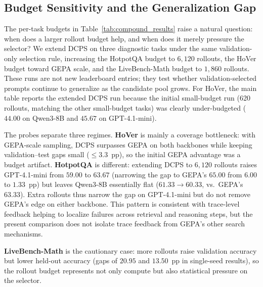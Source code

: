 \documentclass[runningheads]{llncs}
\begin{document}
\subsection{Budget Sensitivity and the Generalization Gap}
\label{sec:budget-matched}
The per-task budgets in Table~\ref{tab:compound_results} raise a natural question: when does a larger rollout budget help, and when does it merely pressure the selector? We extend DCPS on three diagnostic tasks under the same validation-only selection rule, increasing the HotpotQA budget to $6{,}120$ rollouts, the HoVer budget toward GEPA scale, and the LiveBench-Math budget to $1{,}860$ rollouts. These runs are not new leaderboard entries; they test whether validation-selected prompts continue to generalize as the candidate pool grows. For HoVer, the main table reports the extended DCPS run because the initial small-budget run (620 rollouts, matching the other small-budget tasks) was clearly under-budgeted ($44.00$ on Qwen3-8B and $45.67$ on GPT-4.1-mini).

The probes separate three regimes. \textbf{HoVer} is mainly a coverage bottleneck: with GEPA-scale sampling, DCPS surpasses GEPA on both backbones while keeping validation--test gaps small ($\le3.3$~pp), so the initial GEPA advantage was a budget artifact. \textbf{HotpotQA} is different: extending DCPS to $6{,}120$ rollouts raises GPT-4.1-mini from $59.00$ to $63.67$ (narrowing the gap to GEPA's $65.00$ from $6.00$ to $1.33$~pp) but leaves Qwen3-8B essentially flat ($61.33\!\to\!60.33$, vs.\ GEPA's $63.33$). Extra rollouts thus narrow the gap on GPT-4.1-mini but do not remove GEPA's edge on either backbone. This pattern is consistent with trace-level feedback helping to localize failures across retrieval and reasoning steps, but the present comparison does not isolate trace feedback from GEPA's other search mechanisms.

\textbf{LiveBench-Math} is the cautionary case: more rollouts raise validation accuracy but lower held-out accuracy (gaps of $20.95$ and $13.50$~pp in single-seed results), so the rollout budget represents not only compute but also statistical pressure on the selector.
\end{document}
